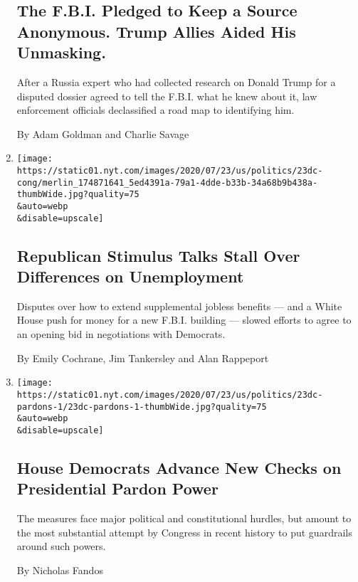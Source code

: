 \begin{enumerate}
  \hypertarget{the-fbi-pledged-to-keep-a-source-anonymous-trump-allies-aided-his-unmasking}{%
  \subsection{The F.B.I. Pledged to Keep a Source Anonymous. Trump
  Allies Aided His
  Unmasking.}\label{the-fbi-pledged-to-keep-a-source-anonymous-trump-allies-aided-his-unmasking}}

  After a Russia expert who had collected research on Donald Trump for a
  disputed dossier agreed to tell the F.B.I. what he knew about it, law
  enforcement officials declassified a road map to identifying him.

  By Adam Goldman and Charlie Savage
\item
  \href{/2020/07/23/us/politics/republicans-stimulus-coronavirus.html}{}

  \texttt{[image: https://static01.nyt.com/images/2020/07/23/us/politics/23dc-cong/merlin\_174871641\_5ed4391a-79a1-4dde-b33b-34a68b9b438a-thumbWide.jpg?quality=75\\\&auto=webp\\\&disable=upscale]}

  \hypertarget{republican-stimulus-talks-stall-over-differences-on-unemployment}{%
  \subsection{Republican Stimulus Talks Stall Over Differences on
  Unemployment}\label{republican-stimulus-talks-stall-over-differences-on-unemployment}}

  Disputes over how to extend supplemental jobless benefits --- and a
  White House push for money for a new F.B.I. building --- slowed
  efforts to agree to an opening bid in negotiations with Democrats.

  By Emily Cochrane, Jim Tankersley and Alan Rappeport
\item
  \href{/2020/07/23/us/politics/democrats-congress-presidential-pardons.html}{}

  \texttt{[image: https://static01.nyt.com/images/2020/07/23/us/politics/23dc-pardons-1/23dc-pardons-1-thumbWide.jpg?quality=75\\\&auto=webp\\\&disable=upscale]}

  \hypertarget{house-democrats-advance-new-checks-on-presidential-pardon-power}{%
  \subsection{House Democrats Advance New Checks on Presidential Pardon
  Power}\label{house-democrats-advance-new-checks-on-presidential-pardon-power}}

  The measures face major political and constitutional hurdles, but
  amount to the most substantial attempt by Congress in recent history
  to put guardrails around such powers.

  By Nicholas Fandos
\end{enumerate}

